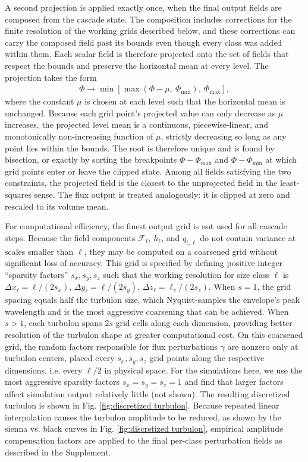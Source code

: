 \documentclass[acp, manuscript, english]{copernicus}
\begin{document}
A second projection is applied exactly once, when the final output fields are composed from the cascade state. The composition includes corrections for the finite resolution of the working grids described below, and these corrections can carry the composed field past its bounds even though every class was added within them. Each scalar field is therefore projected onto the set of fields that respect the bounds and preserve the horizontal mean at every level. The projection takes the form
\begin{align}
  \Phi \rightarrow \min\left[\max\left(\Phi - \mu,\ \Phi_{\min}\right),\ \Phi_{\max}\right], \label{apxeq:bound projection}
\end{align}
where the constant $\mu$ is chosen at each level such that the horizontal mean is unchanged. Because each grid point's projected value can only decrease as $\mu$ increases, the projected level mean is a continuous, piecewise-linear, and monotonically non-increasing function of $\mu$, strictly decreasing so long as any point lies within the bounds. The root is therefore unique and is found by bisection, or exactly by sorting the breakpoints $\Phi - \Phi_{\max}$ and $\Phi - \Phi_{\min}$ at which grid points enter or leave the clipped state. Among all fields satisfying the two constraints, the projected field is the closest to the unprojected field in the least-squares sense. The flux output is treated analogously: it is clipped at zero and rescaled to its volume mean.

For computational efficiency, the finest output grid is not used for all cascade steps. Because the field components $\mathcal{F}_\ell$, $h_\ell$, and $q_{t,\ell}$ do not contain variance at scales smaller than $\ell$, they may be computed on a coarsened grid without significant loss of accuracy. This grid is specified by defining positive integer ``sparsity factors'' $s_x, s_y, s_z$ such that the working resolution for size class $\ell$ is $\Delta x_\ell = \ell/(2s_x)$, $\Delta y_\ell = \ell/(2s_y)$, $\Delta z_\ell = \ell_z/(2s_z)$. When $s=1$, the grid spacing equals half the turbulon size, which Nyquist-samples the envelope's peak wavelength and is the most aggressive coarsening that can be achieved. When $s > 1$, each turbulon spans $2s$ grid cells along each dimension, providing better resolution of the turbulon shape at greater computational cost. On this coarsened grid, the random factors responsible for flux perturbations $\gamma$ are nonzero only at turbulon centers, placed every $s_x, s_y, s_z$ grid points along the respective dimensions, i.e. every $\ell/2$ in physical space. For the simulations here, we use the most aggressive sparsity factors $s_x=s_y=s_z=1$ and find that larger factors affect simulation output relatively little (not shown). The resulting discretized turbulon is shown in Fig. \ref{fig:discretized turbulon}. Because repeated linear interpolation causes the turbulon amplitude to be reduced, as shown by the sienna vs. black curves in Fig. \ref{fig:discretized turbulon}, empirical amplitude compensation factors are applied to the final per-class perturbation fields as described in the Supplement.
\end{document}
